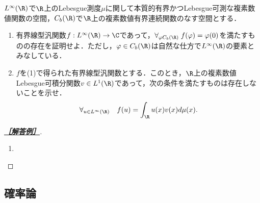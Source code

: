 \documentclass[uplatex,dvipdfmx]{jsarticle}
\begin{document}
\begin{tcolorbox}[colframe=ForestGreen, colback=ForestGreen!10!white,breakable,colbacktitle=ForestGreen!40!white,coltitle=black,fonttitle=\bfseries\sffamily,
    title=B 第12問（関数解析）]
    $L^\infty(\R)$で$\R$上のLebesgue測度$\mu$に関して本質的有界かつLebesgue可測な複素数値関数の空間，$C_b(\R)$で$\R$上の複素数値有界連続関数のなす空間とする．
    \begin{enumerate}
        \item 有界線型汎関数$f:L^\infty(\R)\to\C$であって，$\forall_{\varphi C_b(\R)}\;f(\varphi)=\varphi(0)$を満たすものの存在を証明せよ．ただし，$\varphi\in C_b(\R)$は自然な仕方で$L^\infty(\R)$の要素とみなしている．
        \item $f$を(1)で得られた有界線型汎関数とする．このとき，$\R$上の複素数値Lebesgue可積分関数$v\in L^1(\R)$であって，次の条件を満たすものは存在しないことを示せ．
        \[\forall_{u\in L^\infty(\R)}\quad f(u)=\int_\R u(x)v(x)d\mu(x).\]
    \end{enumerate}
\end{tcolorbox}
\begin{proof}[\textbf{\underline{［解答例］}}]\mbox{}
    \begin{enumerate}
        \item 
    \end{enumerate}
\end{proof}

\subsection{確率論}
\end{document}
